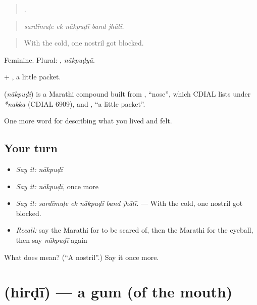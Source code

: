 \begin{quote}
    .
\end{quote}

\begin{quote}
\emph{sardīmuḷe ek nākpuḍī band jhālī.}
\end{quote}

\begin{quote}
With the cold, one nostril got blocked.
\end{quote}

Feminine. Plural: , \emph{nākpuḍyā}.

 + , a little packet.

\begin{cousinweb}
\textbf{} (\emph{nākpuḍī}) is a Marathi compound built from , \textquotedblleft{}nose\textquotedblright{}, which CDIAL lists under \emph{*nakka} (CDIAL 6909), and , \textquotedblleft{}a little packet\textquotedblright{}.
\end{cousinweb}

\begin{grammarlens}[title={What you've built}]
One more word for describing what you lived and felt.
\end{grammarlens}

\subsection*{Your turn}
\begin{itemize}
\raggedright
  \item \emph{Say it:} \emph{nākpuḍī}
  \item \emph{Say it:} \emph{nākpuḍī}, once more
  \item \emph{Say it:} \emph{sardīmuḷe ek nākpuḍī band jhālī.} — With the cold, one nostril got blocked.
  \item \emph{Recall:} say the Marathi for to be scared of, then the Marathi for the eyeball, then say \emph{nākpuḍī} again
\end{itemize}

\begin{tcolorbox}[breakable,colback=teal!4,colframe=teal!35!black,title={Before you move on}]
What does  mean? (\textquotedblleft{}A nostril\textquotedblright{}.) Say it once more.
\end{tcolorbox}
\section[\texorpdfstring{\mr{हिरडी} (hirḍī)}{हिरडी (hirḍī)}]{ (hirḍī) — a gum (of the mouth)}

